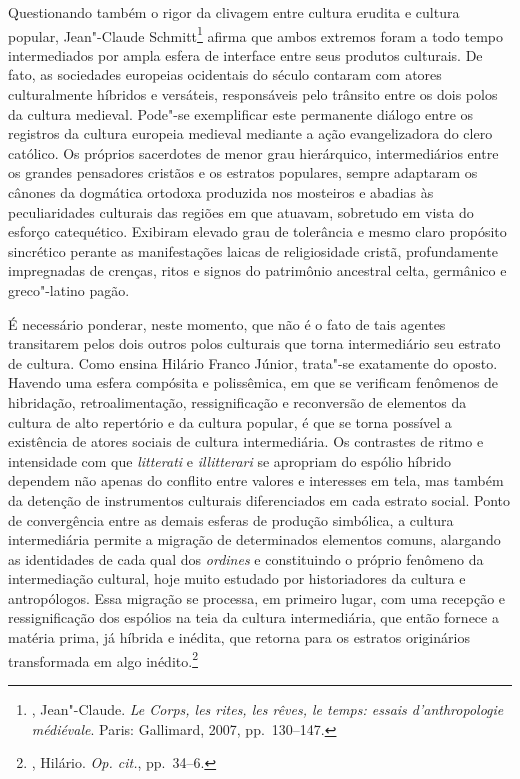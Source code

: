 Questionando também o rigor da clivagem entre cultura erudita e cultura popular,
Jean"-Claude Schmitt\footnote{ , Jean"-Claude. \textit{Le Corps, les
rites, les rêves, le temps: essais d’anthropologie médiévale}. Paris:
Gallimard, 2007, pp.~130--147.} afirma que ambos extremos foram a todo tempo
intermediados por ampla esfera de interface entre seus produtos culturais. De
fato, as sociedades europeias ocidentais do século  contaram com atores
culturalmente híbridos e versáteis, responsáveis pelo trânsito entre os dois
polos da cultura medieval. Pode"-se exemplificar este permanente diálogo entre
os registros da cultura europeia medieval mediante a ação evangelizadora do
clero católico. Os próprios sacerdotes de menor grau hierárquico,
intermediários entre os grandes pensadores cristãos e os estratos populares,
sempre adaptaram os cânones da dogmática ortodoxa produzida nos mosteiros e
abadias às peculiaridades culturais das regiões em que atuavam, sobretudo em
vista do esforço catequético. Exibiram elevado grau de tolerância e mesmo
claro propósito sincrético perante as manifestações laicas de religiosidade
cristã, profundamente impregnadas de crenças, ritos e signos do patrimônio
ancestral celta, germânico e greco"-latino pagão. 

É necessário ponderar, neste momento, que não é o fato de tais agentes
transitarem pelos dois outros polos culturais que torna intermediário seu
estrato de cultura. Como ensina Hilário Franco Júnior, trata"-se exatamente do
oposto. Havendo uma esfera compósita e polissêmica, em que se verificam fenômenos
de hibridação, retroalimentação, ressignificação e reconversão de elementos da
cultura de alto repertório e da cultura popular, é que se torna possível a
existência de atores sociais de cultura intermediária. Os contrastes de ritmo e
intensidade com que \textit{litterati} e \textit{illitterari} se apropriam do
espólio híbrido dependem não apenas do conflito entre valores e interesses em
tela, mas também da detenção de instrumentos culturais diferenciados em cada
estrato social. Ponto de convergência entre as demais esferas de produção simbólica,
a cultura intermediária permite a migração de determinados elementos
comuns, alargando as identidades de cada qual dos \textit{ordines} e
constituindo o próprio fenômeno da intermediação cultural, hoje muito estudado
por historiadores da cultura e antropólogos. Essa migração se processa, em
primeiro lugar, com uma recepção e ressignificação dos espólios na teia da
cultura intermediária, que então fornece a matéria prima, já híbrida e inédita, que
retorna para os estratos originários transformada em algo inédito.\footnote{
, Hilário. \textit{Op. cit.}, pp.~34--6. }

